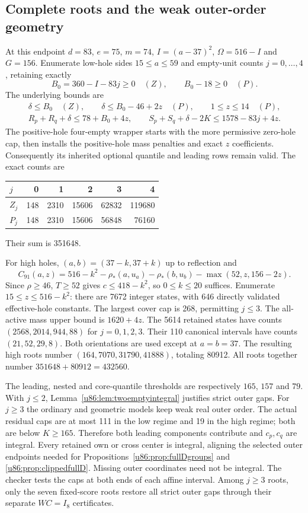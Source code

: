 \documentclass[11pt,a4paper]{article}
\theoremstyle{remark}
\begin{document}
\subsection{Complete roots and the weak outer-order geometry}
At this endpoint $d=83$, $e=75$, $m=74$, $I=(a-37)^2$,
$\Omega=516-I$ and $G=156$. Enumerate low-hole sides $15\le a\le59$
and empty-unit counts $j=0,\ldots,4$, retaining exactly
\[
 B_0=360-I-83j\ge0\quad(Z),\qquad B_0-18\ge0\quad(P).
\]
The underlying bounds are
\begin{gather*}
 \delta\le B_0\quad(Z),\qquad
 \delta\le B_0-46+2z\quad(P),\qquad1\le z\le14\quad(P),\\
 R_p+R_q+\delta\le78+B_0+4z,\qquad
 S_p+S_q+\delta-2K\le1578-83j+4z.
\end{gather*}
The positive-hole four-empty wrapper starts with the more permissive
zero-hole cap, then installs the positive-hole mass penalties and exact
$z$ coefficients. Consequently its inherited optional quantile and
leading rows remain valid. The exact counts are
\begin{center}\small
\begin{tabular}{lrrrrr}
\toprule
$j$&0&1&2&3&4\\\midrule
$Z_j$&148&2310&15606&62832&119680\\
$P_j$&148&2310&15606&56848&76160\\\bottomrule
\end{tabular}
\end{center}
Their sum is 351648.

For high holes, $(a,b)=(37-k,37+k)$ up to reflection and
\[
 C_{91}(a,z)=516-k^2-\rho_*(a,u_a)-\rho_*(b,u_b)
                              -\max(52,z,156-2z).
\]
Since $\rho\ge46$, $T\ge52$ gives $c\le418-k^2$, so
$0\le k\le20$ suffices. Enumerate $15\le z\le516-k^2$: there are
7672 integer states, with 646 directly validated effective-hole constants.
The largest cover cap is 268, permitting $j\le3$. The all-active mass
upper bound is $1620+4z$.
The 5614 retained states have counts $(2568,2014,944,88)$ for
$j=0,1,2,3$. Their 110 canonical intervals have counts $(21,52,29,8)$.
Both orientations are used except at $a=b=37$. The resulting high roots
number $(164,7070,31790,41888)$, totaling 80912. All roots together number
$351648+80912=432560$.

The leading, nested and core-quantile thresholds are respectively
$165$, $157$ and $79$. With $j\le2$, Lemma~\ref{u86:lem:twoemptyintegral}
justifies strict outer gaps. For $j\ge3$ the ordinary and geometric
models keep weak real outer order. The actual residual caps are at most
111 in the low regime and 19 in the high regime; both are below
$K\ge165$. Therefore both leading components contribute and $c_p,c_q$
are integral. Every retained own or cross center is integral, aligning
the selected outer endpoints needed for Propositions~\ref{u86:prop:fullDgroups}
and \ref{u86:prop:clippedfullD}. Missing outer coordinates need not be
integral. The checker tests the caps at both ends of each affine interval.
Among $j\ge3$ roots, only the seven fixed-score roots restore all strict
outer gaps through
their separate $WC=I_8$ certificates.
\end{document}

